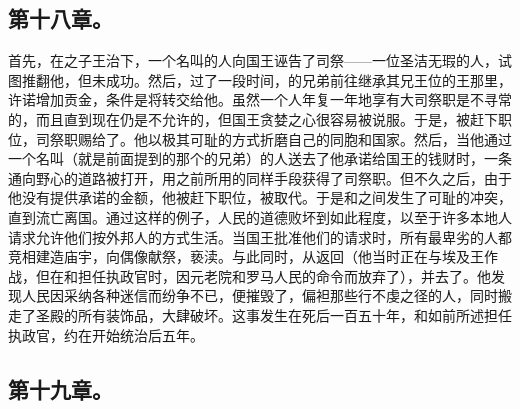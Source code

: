 
\subsection{第十八章。}

首先，在之子王治下，一个名叫的人向国王诬告了司祭——一位圣洁无瑕的人，试图推翻他，但未成功。然后，过了一段时间，的兄弟前往继承其兄王位的王那里，许诺增加贡金，条件是将转交给他。虽然一个人年复一年地享有大司祭职是不寻常的，而且直到现在仍是不允许的，但国王贪婪之心很容易被说服。于是，被赶下职位，司祭职赐给了。他以极其可耻的方式折磨自己的同胞和国家。然后，当他通过一个名叫（就是前面提到的那个的兄弟）的人送去了他承诺给国王的钱财时，一条通向野心的道路被打开，用之前所用的同样手段获得了司祭职。但不久之后，由于他没有提供承诺的金额，他被赶下职位，被取代。于是和之间发生了可耻的冲突，直到流亡离国。通过这样的例子，人民的道德败坏到如此程度，以至于许多本地人请求允许他们按外邦人的方式生活。当国王批准他们的请求时，所有最卑劣的人都竞相建造庙宇，向偶像献祭，亵渎。与此同时，从返回（他当时正在与埃及王作战，但在和担任执政官时，因元老院和罗马人民的命令而放弃了），并去了。他发现人民因采纳各种迷信而纷争不已，便摧毁了，偏袒那些行不虔之径的人，同时搬走了圣殿的所有装饰品，大肆破坏。这事发生在死后一百五十年，和如前所述担任执政官，约在开始统治后五年。\par


\subsection{第十九章。}

